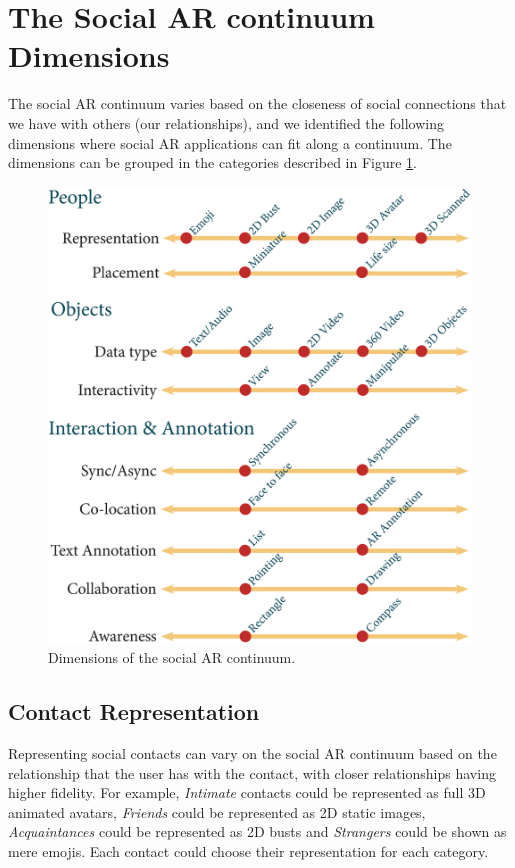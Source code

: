 \section{The Social AR continuum Dimensions}

The social AR continuum varies based on the closeness of social connections that we have with others (our relationships), and we identified the following dimensions where social AR applications can fit along a continuum. The dimensions can be grouped in the categories described in Figure \ref{fig:continuum:dimensions}.

\begin{figure}[h]
    \centering
    \includegraphics[width=.8\linewidth]{images/continuum4_1.eps}
    \caption{Dimensions of the social AR continuum.}
    \label{fig:continuum:dimensions}
\end{figure}

\subsection{Contact Representation}

Representing social contacts can vary on the social AR continuum based on the relationship that the user has with the contact, with closer relationships having higher fidelity. For example, \textit{Intimate} contacts could be represented as full 3D animated avatars, \textit{Friends} could be represented as 2D static images, \textit{Acquaintances} could be represented as 2D busts and \textit{Strangers} could be shown as mere emojis. Each contact could choose their representation for each category.

